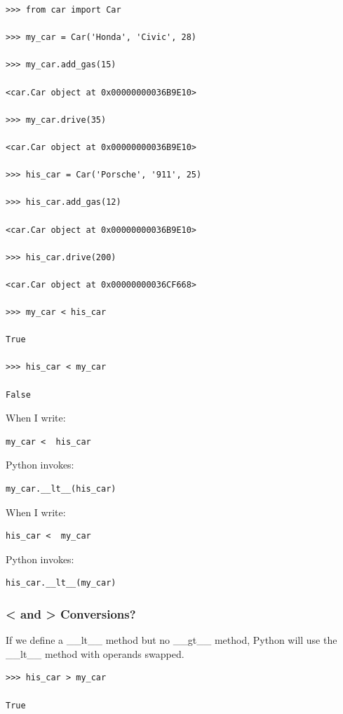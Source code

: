 \documentclass{article}
\begin{document}
\begin{lstlisting}
>>> from car import Car

>>> my_car = Car('Honda', 'Civic', 28)

>>> my_car.add_gas(15)

<car.Car object at 0x00000000036B9E10>

>>> my_car.drive(35)

<car.Car object at 0x00000000036B9E10>

>>> his_car = Car('Porsche', '911', 25)

>>> his_car.add_gas(12)

<car.Car object at 0x00000000036B9E10>

>>> his_car.drive(200)

<car.Car object at 0x00000000036CF668>

>>> my_car < his_car

True

>>> his_car < my_car

False
\end{lstlisting}

When I write:  

\begin{lstlisting}
my_car <  his_car
\end{lstlisting}

Python invokes:

\begin{lstlisting}
my_car.__lt__(his_car)
\end{lstlisting}

When I write:  

\begin{lstlisting}
his_car <  my_car
\end{lstlisting}

Python invokes:
\begin{lstlisting}
his_car.__lt__(my_car)
\end{lstlisting}
 

\subsubsection{< and > Conversions?}
If we define a {\_}{\_}lt{\_}{\_} method but no {\_}{\_}gt{\_}{\_} method, Python will use the {\_}{\_}lt{\_}{\_} method with operands swapped.

\begin{lstlisting}
>>> his_car > my_car

True
\end{lstlisting}
\end{document}
